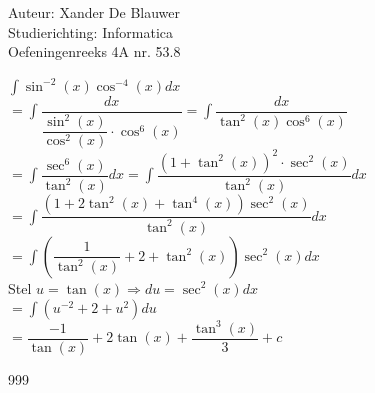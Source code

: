 \documentclass[a4paper]{article}
\begin{document}
\noindent \large Auteur: Xander De Blauwer \\
\noindent \large Studierichting: Informatica\\
\noindent \large Oefeningenreeks 4A nr. 53.8\\

\medskip

\normalsize

$ \displaystyle\int \sin^{-2}(x)\cos^{-4}(x)dx $ \\

$ = \displaystyle\int \dfrac{dx}{\dfrac{\sin^2(x)}{\cos^2(x)} \cdot \cos^6(x)} = \displaystyle\int \dfrac{dx}{\tan^2(x)\cos^6(x)} $ \\

$ = \displaystyle\int \dfrac{\sec^6(x)}{\tan^2(x)}dx = \displaystyle\int \dfrac{(1+\tan^2(x))^2 \cdot \sec^2(x)}{\tan^2(x)}dx $ \\

$ = \displaystyle\int \dfrac{(1 + 2\tan^2(x) + \tan^4(x)) \sec^2(x)} {\tan^2(x)}dx $ \\

$ = \displaystyle\int \left(\dfrac{1}{\tan^2(x)} + 2 + \tan^2(x)\right)\sec^2(x)dx $ \\

Stel $u = \tan(x) \Rightarrow du = \sec^2(x)dx $ \\

$ = \displaystyle\int (u^{-2} + 2 + u^2)du $ \\

$ = \dfrac{-1}{\tan(x)} + 2\tan(x) + \dfrac{\tan^3(x)}{3} + c $ \\



\begin{thebibliography}{999}
\end{thebibliography}
\end{document}
